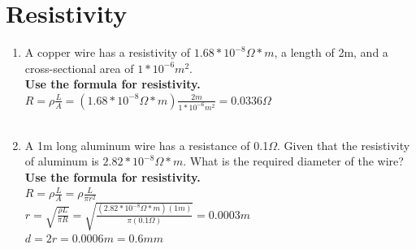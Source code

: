 \documentclass{article}
\begin{document}
\section*{Resistivity}
\begin {enumerate}
    \item A copper wire has a resistivity of $1.68*10^{-8} \Omega*m$, a length of 2m, and a cross-sectional area of $1*10^{-6} m^{2}$.\\
    \textbf{Use the formula for resistivity. \\$R = \rho \frac{L}{A} = (1.68*10^{-8} \Omega*m) \frac{2m}{1*10^{-6} m^{2}} = 0.0336 \Omega$}\\\\
    \item A 1m long aluminum wire has a resistance of 0.1$\Omega$. Given that the resistivity of aluminum is $2.82*10^{-8} \Omega*m$. What is the required diameter of the wire?\\
    \textbf{Use the formula for resistivity. \\$R = \rho \frac{L}{A} = \rho \frac{L}{\pi r^{2}}$\\
    $r = \sqrt{\frac{\rho L}{\pi R}} = \sqrt{\frac{(2.82*10^{-8} \Omega*m)(1m)}{\pi (0.1\Omega)}} = 0.0003 m$\\
    $d = 2r = 0.0006 m = 0.6 mm$}\\
\end {enumerate}
\end{document}
